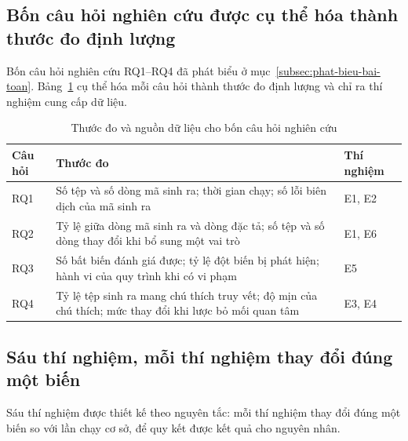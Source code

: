 \subsection{Bốn câu hỏi nghiên cứu được cụ thể hóa thành thước đo định lượng}
\label{subsec:thuoc-do}

Bốn câu hỏi nghiên cứu RQ1--RQ4 đã phát biểu ở mục~\ref{subsec:phat-bieu-bai-toan}. Bảng~\ref{tab:thuoc-do} cụ thể hóa mỗi câu hỏi thành thước đo định lượng và chỉ ra thí nghiệm cung cấp dữ liệu.

\begin{table}[htbp]
\centering
\caption{Thước đo và nguồn dữ liệu cho bốn câu hỏi nghiên cứu}
\label{tab:thuoc-do}
\small
\begin{tabularx}{\textwidth}{@{}lXl@{}}
\toprule
\textbf{Câu hỏi} & \textbf{Thước đo} & \textbf{Thí nghiệm} \\
\midrule
RQ1 & Số tệp và số dòng mã sinh ra; thời gian chạy; số lỗi biên dịch của mã sinh ra & E1, E2 \\
RQ2 & Tỷ lệ giữa dòng mã sinh ra và dòng đặc tả; số tệp và số dòng thay đổi khi bổ sung một vai trò & E1, E6 \\
RQ3 & Số bất biến đánh giá được; tỷ lệ đột biến bị phát hiện; hành vi của quy trình khi có vi phạm & E5 \\
RQ4 & Tỷ lệ tệp sinh ra mang chú thích truy vết; độ mịn của chú thích; mức thay đổi khi lược bỏ mối quan tâm & E3, E4 \\
\bottomrule
\end{tabularx}
\end{table}

\subsection{Sáu thí nghiệm, mỗi thí nghiệm thay đổi đúng một biến}
\label{subsec:bo-thi-nghiem}

Sáu thí nghiệm được thiết kế theo nguyên tắc: mỗi thí nghiệm thay đổi đúng một biến so với lần chạy cơ sở, để quy kết được kết quả cho nguyên nhân.

